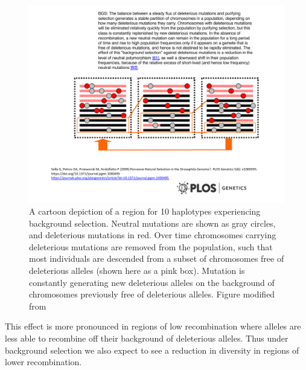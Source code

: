 \begin{figure}
\begin{center}
\includegraphics[width=0.75 \textwidth]{figures/Hitchhiking/BGS_cartoon.pdf}
\end{center}
\caption{A cartoon depiction of a region for 10 haplotypes
  experiencing background selection. Neutral mutations are shown as
  gray circles, and deleterious mutations in red. Over time
  chromosomes carrying deleterious mutations are removed from the
  population, such that most individuals are descended from a subset of
  chromosomes free of deleterious alleles (shown here as a pink
  box). Mutation is constantly generating new deleterious alleles on
  the background of chromosomes previously free of deleterious
  alleles. Figure modified from \citet{sella2009pervasive}} \label{fig:BGS_cartoon}
\end{figure}
This effect is more pronounced in regions of low recombination where
alleles are less able to recombine off their background of deleterious
alleles. Thus under background selection we also expect to see a
reduction in diversity in regions of lower recombination. 

